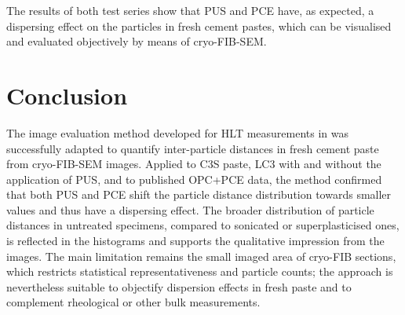 The results of both test series show that \ac{PUS} and \ac{PCE} have, as expected, a dispersing effect on the particles in fresh cement pastes, which can be visualised and evaluated objectively by means of cryo-\ac{FIB}-\ac{SEM}. %

\FloatBarrier
\section{Conclusion}

The image evaluation method developed for \ac{HLT} measurements in  was successfully adapted to quantify inter-particle distances in fresh cement paste from cryo-\ac{FIB}-\ac{SEM} images.
Applied to \ac{C3S} paste, \ac{LC3} with and without the application of \ac{PUS}, and to published \ac{OPC}+\ac{PCE} data, the method confirmed that both \ac{PUS} and \ac{PCE} shift the particle distance distribution towards smaller values and thus have a dispersing effect.
The broader distribution of particle distances in untreated specimens, compared to sonicated or superplasticised ones, is reflected in the histograms and supports the qualitative impression from the images.
The main limitation remains the small imaged area of cryo-\ac{FIB} sections, which restricts statistical representativeness and particle counts; the approach is nevertheless suitable to objectify dispersion effects in fresh paste and to complement rheological or other bulk measurements.

